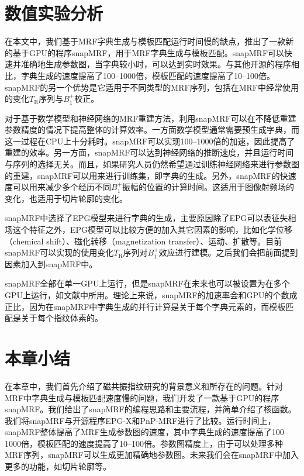 \section{数值实验分析}
在本文中，我们基于MRF字典生成与模板匹配运行时间慢的缺点，推出了一款新的基于GPU的程序snapMRF，用于MRF字典生成与模板匹配。snapMRF可以快速并准确地生成参数图，当字典较小时，可以达到实时效果。与其他开源的程序相比，字典生成的速度提高了100--1000倍，模板匹配的速度提高了10--100倍。snapMRF的另一个优势是它适用于不同类型的MRF序列，包括在MRF中经常使用的变化$T_\mathrm{R}$序列与$B_1^+$校正。

对于基于数学模型和神经网络的MRF重建方法，利用snapMRF可以在不降低重建参数精度的情况下提高整体的计算效率。一方面数学模型通常需要预生成字典，而这一过程在CPU上十分耗时。snapMRF可以实现100--1000倍的加速，因此提高了重建的效率。另一方面，snapMRF可以达到神经网络的推断速度，并且运行时间与序列的选择无关。而且，如果研究人员仍然希望通过训练神经网络来进行参数图的重建，snapMRF可以用来进行训练集，即字典的生成。另外，snapMRF的快速度可以用来减少多个经历不同$B_1^+$振幅的位置的计算时间。这适用于图像射频场的变化，也适用于切片轮廓\cite{Ma_B1_MRF}的变化。

snapMRF中选择了EPG模型来进行字典的生成，主要原因除了EPG可以表征失相场这个特征之外，EPG模型可以比较方便的加入其它因素的影响，比如化学位移（chemical shift）、磁化转移（magnetization transfer）\cite{Hamilton}、运动、扩散等。目前snapMRF可以实现的使用变化$T_\mathrm{R}$序列对$B_1^+$效应进行建模。之后我们会把前面提到因素加入到snapMRF中。

snapMRF全部在单一GPU上运行，但是snapMRF在未来也可以被设置为在多个GPU上运行，如文献\cite{tron}中所用。理论上来说，snapMRF的加速率会和GPU的个数成正比，因为在snapMRF中字典生成的并行计算是关于每个字典元素的，而模板匹配是关于每个指纹体素的。

\section{本章小结}
在本章中，我们首先介绍了磁共振指纹研究的背景意义和所存在的问题。针对MRF中字典生成与模板匹配速度慢的问题，我们开发了一款基于GPU的程序snapMRF。我们给出了snapMRF的编程思路和主要流程，并简单介绍了核函数。我们将snapMRF与开源程序EPG-X和PnP-MRF进行了比较。运行时间上，snapMRF整体提高了MRF生成参数图的速度，其中字典生成的速度提高了100--1000倍，模板匹配的速度提高了10--100倍。参数图精度上，由于可以处理多种MRF序列，snapMRF可以生成更加精确地参数图。未来我们会在snapMRF中加入更多的功能，如切片轮廓等。





















